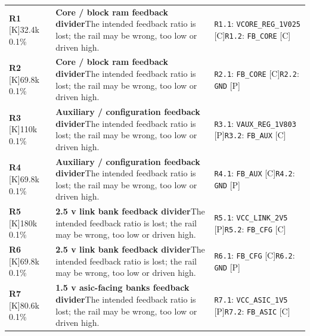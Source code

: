 \documentclass[11pt,a4paper]{article}
\begin{document}
\begin{longtable}{@{}P{27mm}P{77mm}P{62mm}@{}}
\textbf{R1} [K]\newline 32.4k 0.1\% & \textbf{Core / block ram feedback divider}\newline The intended feedback ratio is lost; the rail may be wrong, too low or driven high. & \nolinkurl{R1.1}: \nolinkurl{VCORE_REG_1V025} [C]\newline \nolinkurl{R1.2}: \nolinkurl{FB_CORE} [C] \\
\textbf{R2} [K]\newline 69.8k 0.1\% & \textbf{Core / block ram feedback divider}\newline The intended feedback ratio is lost; the rail may be wrong, too low or driven high. & \nolinkurl{R2.1}: \nolinkurl{FB_CORE} [C]\newline \nolinkurl{R2.2}: \nolinkurl{GND} [P] \\
\textbf{R3} [K]\newline 110k 0.1\% & \textbf{Auxiliary / configuration feedback divider}\newline The intended feedback ratio is lost; the rail may be wrong, too low or driven high. & \nolinkurl{R3.1}: \nolinkurl{VAUX_REG_1V803} [P]\newline \nolinkurl{R3.2}: \nolinkurl{FB_AUX} [C] \\
\textbf{R4} [K]\newline 69.8k 0.1\% & \textbf{Auxiliary / configuration feedback divider}\newline The intended feedback ratio is lost; the rail may be wrong, too low or driven high. & \nolinkurl{R4.1}: \nolinkurl{FB_AUX} [C]\newline \nolinkurl{R4.2}: \nolinkurl{GND} [P] \\
\textbf{R5} [K]\newline 180k 0.1\% & \textbf{2.5 v link bank feedback divider}\newline The intended feedback ratio is lost; the rail may be wrong, too low or driven high. & \nolinkurl{R5.1}: \nolinkurl{VCC_LINK_2V5} [P]\newline \nolinkurl{R5.2}: \nolinkurl{FB_CFG} [C] \\
\textbf{R6} [K]\newline 69.8k 0.1\% & \textbf{2.5 v link bank feedback divider}\newline The intended feedback ratio is lost; the rail may be wrong, too low or driven high. & \nolinkurl{R6.1}: \nolinkurl{FB_CFG} [C]\newline \nolinkurl{R6.2}: \nolinkurl{GND} [P] \\
\textbf{R7} [K]\newline 80.6k 0.1\% & \textbf{1.5 v asic-facing banks feedback divider}\newline The intended feedback ratio is lost; the rail may be wrong, too low or driven high. & \nolinkurl{R7.1}: \nolinkurl{VCC_ASIC_1V5} [P]\newline \nolinkurl{R7.2}: \nolinkurl{FB_ASIC} [C] \\

\end{longtable}
\end{document}
